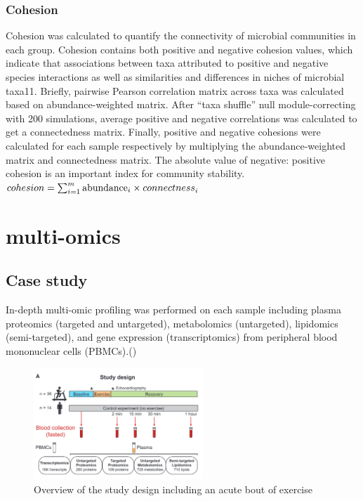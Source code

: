 \documentclass[
]{book}
\begin{document}
\hypertarget{cohesion}{%
\subsection{Cohesion}\label{cohesion}}

Cohesion was calculated to quantify the connectivity of microbial communities in each group. Cohesion contains both positive and negative cohesion values, which indicate that associations between taxa attributed to positive and negative species interactions as well as similarities and differences in niches of microbial taxa11. Briefly, pairwise Pearson correlation matrix across taxa was calculated based on abundance-weighted matrix. After ``taxa shuffle'' null module-correcting with 200 simulations, average positive and negative correlations was calculated to get a connectedness matrix. Finally, positive and negative cohesions were calculated for each sample respectively by multiplying the abundance-weighted matrix and connectedness matrix. The absolute value of negative: positive cohesion is an important index for community stability.
\(cohesion=\sum_{i=1}^{m}{{\rm abundance}_i\times connectness}_i\)

\hypertarget{multi-omics}{%
\chapter{multi-omics}\label{multi-omics}}

\hypertarget{case-study}{%
\section{Case study}\label{case-study}}

In-depth multi-omic profiling was performed on each sample including plasma proteomics (targeted and untargeted), metabolomics (untargeted), lipidomics (semi-targeted), and gene expression (transcriptomics) from peripheral blood mononuclear cells (PBMCs).(\citet{contrepoisMolecularChoreographyAcute2020})

\begin{figure}
\includegraphics[width=2.51in]{images/7-1.cell_study} \caption{Overview of the study design including an acute bout of exercise}\label{fig:cell-study}
\end{figure}

  
\end{document}
